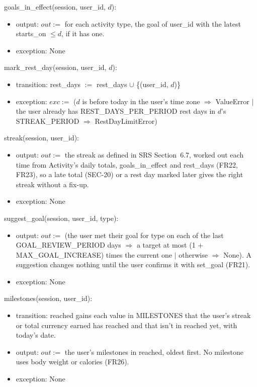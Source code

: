 \documentclass[12pt, titlepage]{article}
\begin{document}
\noindent goals\_in\_effect(session, user\_id, $d$):
\begin{itemize}
\item output: $out :=$ for each activity type, the goal of user\_id with the
  latest starts\_on $\le d$, if it has one.
\item exception: None
\end{itemize}

\noindent mark\_rest\_day(session, user\_id, $d$):
\begin{itemize}
\item transition: rest\_days $:=$ rest\_days $\cup$ \{(user\_id, $d$)\}
\item exception: $exc :=$ ($d$ is before today in the user's time zone
  $\Rightarrow$ ValueError $|$ the user already has REST\_DAYS\_PER\_PERIOD
  rest days in $d$'s STREAK\_PERIOD $\Rightarrow$ RestDayLimitError)
\end{itemize}

\noindent streak(session, user\_id):
\begin{itemize}
\item output: $out :=$ the streak as defined in SRS Section~6.7, worked out
  each time from Activity's daily totals, goals\_in\_effect and rest\_days
  (FR22, FR23), so a late total (SEC-20) or a rest day marked later gives the
  right streak without a fix-up.
\item exception: None
\end{itemize}

\noindent suggest\_goal(session, user\_id, type):
\begin{itemize}
\item output: $out :=$ (the user met their goal for type on each of the last
  GOAL\_REVIEW\_PERIOD days $\Rightarrow$ a target at most
  (1 + MAX\_GOAL\_INCREASE) times the current one $|$ otherwise $\Rightarrow$
  None). A suggestion changes nothing until the user confirms it with
  set\_goal (FR21).
\item exception: None
\end{itemize}

\noindent milestones(session, user\_id):
\begin{itemize}
\item transition: reached gains each value in MILESTONES that the user's
  streak or total currency earned has reached and that isn't in reached yet,
  with today's date.
\item output: $out :=$ the user's milestones in reached, oldest first. No
  milestone uses body weight or calories (FR26).
\item exception: None
\end{itemize}
\end{document}
